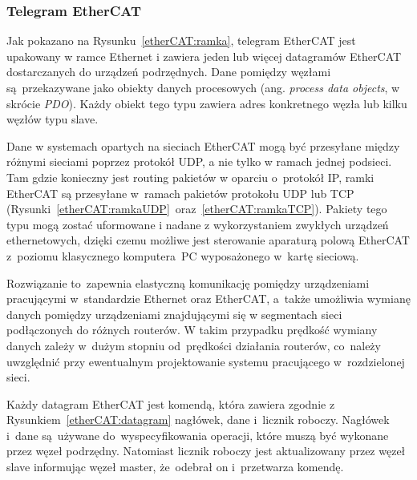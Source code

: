 \subsubsection{Telegram EtherCAT}
\label{subsec:telegram}
Jak pokazano na Rysunku~\ref{etherCAT:ramka}, telegram EtherCAT jest upakowany w  ramce Ethernet i  zawiera jeden lub więcej datagramów EtherCAT dostarczanych do urządzeń podrzędnych. Dane pomiędzy węzłami są~przekazywane jako obiekty danych procesowych (ang. \textit{process data objects}, w skrócie \textit{PDO}). Każdy obiekt tego typu zawiera adres konkretnego węzła lub kilku węzłów typu slave.

Dane w systemach opartych na sieciach EtherCAT mogą być przesyłane między różnymi sieciami poprzez protokół UDP, a nie tylko w ramach jednej podsieci. Tam gdzie konieczny jest routing pakietów w oparciu o~protokół IP, ramki EtherCAT są przesyłane w~ramach pakietów protokołu UDP lub TCP (Rysunki~\ref{etherCAT:ramkaUDP}~oraz~\ref{etherCAT:ramkaTCP}). Pakiety tego typu mogą zostać uformowane i nadane z wykorzystaniem zwykłych urządzeń ethernetowych, dzięki czemu możliwe jest sterowanie aparaturą polową EtherCAT z~poziomu klasycznego komputera~PC wyposażonego w~kartę sieciową.

Rozwiązanie to~zapewnia elastyczną komunikację pomiędzy urządzeniami pracującymi w~standardzie Ethernet oraz EtherCAT, a~także umożliwia wymianę danych pomiędzy urządzeniami znajdującymi się w segmentach sieci podłączonych do różnych routerów. W takim przypadku prędkość wymiany danych zależy w~dużym stopniu od~prędkości działania routerów, co~należy uwzględnić przy ewentualnym projektowanie systemu pracującego w~rozdzielonej sieci.

Każdy datagram EtherCAT jest komendą, która zawiera zgodnie z Rysunkiem~\ref{etherCAT:datagram} nagłówek, dane i~licznik roboczy. Nagłówek i~dane są~używane do~wyspecyfikowania operacji, które muszą być wykonane przez węzeł podrzędny. Natomiast licznik roboczy jest aktualizowany przez węzeł slave informując węzeł master, że~odebrał on i~przetwarza komendę.

